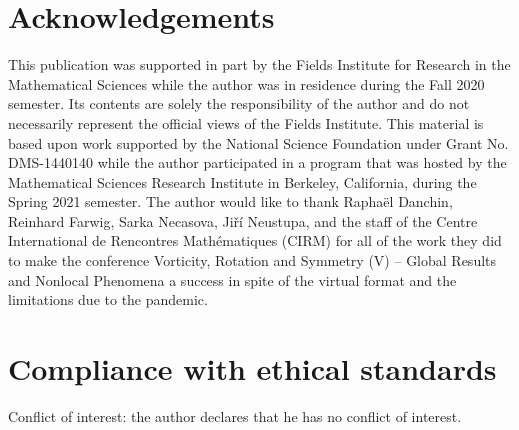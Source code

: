 \documentclass[11pt]{article}
\theoremstyle{plain}
\theoremstyle{remark}
\numberwithin{equation}{section}
\begin{document}
\section*{Acknowledgements}
This publication was supported in part by the Fields Institute for Research in the Mathematical Sciences while the author was in residence during the Fall 2020 semester. Its contents are solely the responsibility of the author and do not necessarily represent the official views of the Fields Institute.
This material is based upon work supported by the National Science Foundation under Grant No. DMS-1440140 while the author participated in a program that was hosted by the Mathematical Sciences Research Institute in Berkeley, California, during the Spring 2021 semester.
The author would like to thank Rapha\"el Danchin, Reinhard Farwig, Sarka Necasova, Ji\v{r}\'{i} Neustupa, and the staff of the Centre International de Rencontres Mathématiques (CIRM) for all of the work they did to make the conference Vorticity, Rotation and Symmetry (V) – Global Results and Nonlocal Phenomena a success in spite of the virtual format and the limitations due to the pandemic.


\section*{Compliance with ethical standards}
Conflict of interest: the author declares that he has no conflict of interest.


\end{document}
